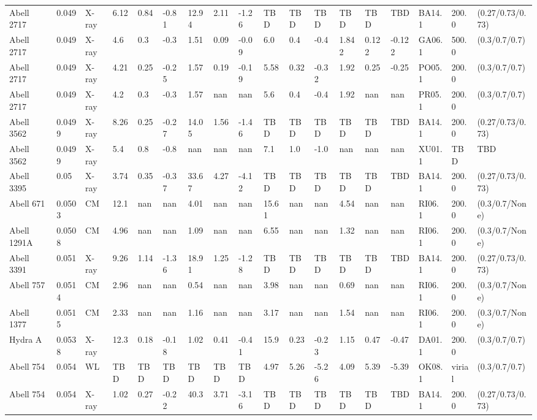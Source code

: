 \documentclass{article}
\begin{document}
\begin{center}
\begin{landscape}
\begin{longtable}{llllllllllllllllll}
Abell 2717 & 0.049 & X-ray & 6.12 & 0.84 & -0.81 & 12.94 & 2.11 & -1.26 & TBD & TBD & TBD & TBD & TBD & TBD & BA14.1 & 200.0 & (0.27/0.73/0.73) \\
Abell 2717 & 0.049 & X-ray & 4.6 & 0.3 & -0.3 & 1.51 & 0.09 & -0.09 & 6.0 & 0.4 & -0.4 & 1.842 & 0.122 & -0.122 & GA06.1 & 500.0 & (0.3/0.7/0.7) \\
Abell 2717 & 0.049 & X-ray & 4.21 & 0.25 & -0.25 & 1.57 & 0.19 & -0.19 & 5.58 & 0.32 & -0.32 & 1.92 & 0.25 & -0.25 & PO05.1 & 200.0 & (0.3/0.7/0.7) \\
Abell 2717 & 0.049 & X-ray & 4.2 & 0.3 & -0.3 & 1.57 & nan & nan & 5.6 & 0.4 & -0.4 & 1.92 & nan & nan & PR05.1 & 200.0 & (0.3/0.7/0.7) \\
Abell 3562 & 0.0499 & X-ray & 8.26 & 0.25 & -0.27 & 14.05 & 1.56 & -1.46 & TBD & TBD & TBD & TBD & TBD & TBD & BA14.1 & 200.0 & (0.27/0.73/0.73) \\
Abell 3562 & 0.0499 & X-ray & 5.4 & 0.8 & -0.8 & nan & nan & nan & 7.1 & 1.0 & -1.0 & nan & nan & nan & XU01.1 & TBD & TBD \\
Abell 3395 & 0.05 & X-ray & 3.74 & 0.35 & -0.37 & 33.67 & 4.27 & -4.12 & TBD & TBD & TBD & TBD & TBD & TBD & BA14.1 & 200.0 & (0.27/0.73/0.73) \\
Abell 671 & 0.0503 & CM & 12.1 & nan & nan & 4.01 & nan & nan & 15.61 & nan & nan & 4.54 & nan & nan & RI06.1 & 200.0 & (0.3/0.7/None) \\
Abell 1291A & 0.0508 & CM & 4.96 & nan & nan & 1.09 & nan & nan & 6.55 & nan & nan & 1.32 & nan & nan & RI06.1 & 200.0 & (0.3/0.7/None) \\
Abell 3391 & 0.051 & X-ray & 9.26 & 1.14 & -1.36 & 18.91 & 1.25 & -1.28 & TBD & TBD & TBD & TBD & TBD & TBD & BA14.1 & 200.0 & (0.27/0.73/0.73) \\
Abell 757 & 0.0514 & CM & 2.96 & nan & nan & 0.54 & nan & nan & 3.98 & nan & nan & 0.69 & nan & nan & RI06.1 & 200.0 & (0.3/0.7/None) \\
Abell 1377 & 0.0515 & CM & 2.33 & nan & nan & 1.16 & nan & nan & 3.17 & nan & nan & 1.54 & nan & nan & RI06.1 & 200.0 & (0.3/0.7/None) \\
Hydra A & 0.0538 & X-ray & 12.3 & 0.18 & -0.18 & 1.02 & 0.41 & -0.41 & 15.9 & 0.23 & -0.23 & 1.15 & 0.47 & -0.47 & DA01.1 & 200.0 & (0.3/0.7/0.7) \\
Abell 754 & 0.054 & WL & TBD & TBD & TBD & TBD & TBD & TBD & 4.97 & 5.26 & -5.26 & 4.09 & 5.39 & -5.39 & OK08.1 & virial & (0.3/0.7/0.7) \\
Abell 754 & 0.054 & X-ray & 1.02 & 0.27 & -0.22 & 40.3 & 3.71 & -3.16 & TBD & TBD & TBD & TBD & TBD & TBD & BA14.1 & 200.0 & (0.27/0.73/0.73) \\

\end{longtable}
\end{landscape}
\end{center}
\end{document}
